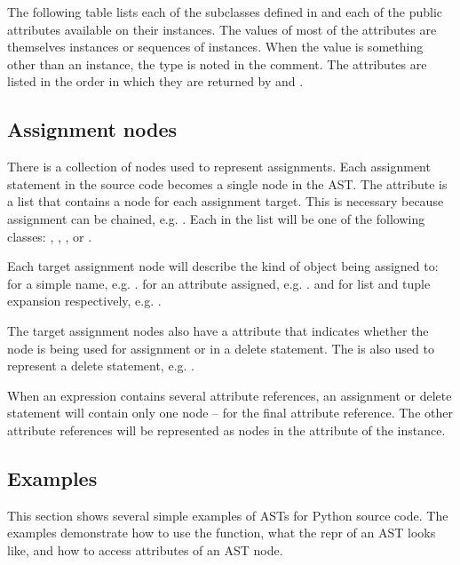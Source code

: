 \documentclass{howto}
\begin{document}
The following table lists each of the  subclasses defined
in  and each of the public attributes available
on their instances.  The values of most of the attributes are
themselves  instances or sequences of instances.  When the
value is something other than an instance, the type is noted in the
comment.  The attributes are listed in the order in which they are
returned by  and .




\subsection{Assignment nodes}

There is a collection of nodes used to represent assignments.  Each
assignment statement in the source code becomes a single
 node in the AST.  The  attribute is a
list that contains a node for each assignment target.  This is
necessary because assignment can be chained, e.g. .
Each  in the list will be one of the following classes: 
, , , or
. 

Each target assignment node will describe the kind of object being
assigned to:   for a simple name, e.g. .
 for an attribute assigned, e.g. .
 and  for list and tuple expansion
respectively, e.g. .

The target assignment nodes also have a  attribute that
indicates whether the node is being used for assignment or in a delete
statement.  The  is also used to represent a delete
statement, e.g. .

When an expression contains several attribute references, an
assignment or delete statement will contain only one 
node -- for the final attribute reference.  The other attribute
references will be represented as  nodes in the
 attribute of the  instance.

\subsection{Examples}

This section shows several simple examples of ASTs for Python source
code.  The examples demonstrate how to use the 
function, what the repr of an AST looks like, and how to access
attributes of an AST node.
\end{document}
